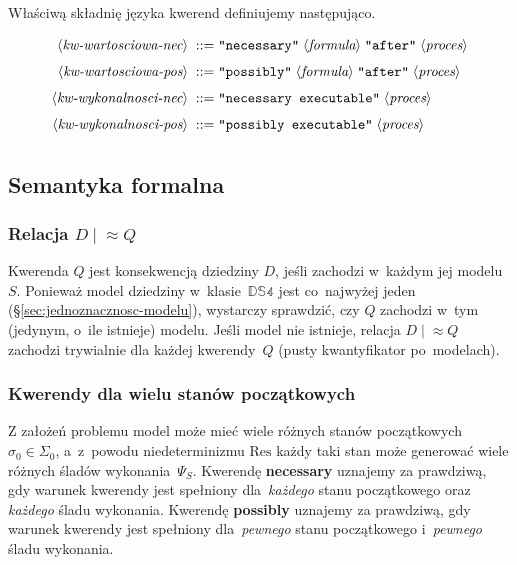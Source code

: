 \documentclass[11pt,a4paper]{article}
\newcommand{\bnfchar}[1]{\texttt{\textquotedbl#1\textquotedbl}}
\newcommand{\bnfsym}[1]{\langle \textit{#1} \rangle}
\theoremstyle{definition}
\begin{document}
Właściwą składnię języka kwerend definiujemy następująco.

\begin{align*}
    \bnfsym{kw-wartosciowa-nec} \;::=\;& \bnfchar{necessary} \; \bnfsym{formula} \; \bnfchar{after} \; \bnfsym{proces} \\[4pt]
    \bnfsym{kw-wartosciowa-pos} \;::=\;& \bnfchar{possibly} \; \bnfsym{formula} \; \bnfchar{after} \; \bnfsym{proces} \\[4pt]    
    \bnfsym{kw-wykonalnosci-nec} \;::=\;& \bnfchar{necessary executable} \; \bnfsym{proces} \\[4pt]
    \bnfsym{kw-wykonalnosci-pos} \;::=\;& \bnfchar{possibly executable} \; \bnfsym{proces} \\[4pt]    
\end{align*}

\subsection{Semantyka formalna}
\label{sec:sem-kwerend}

\subsubsection*{Relacja \texorpdfstring{$D \mid \! \approx Q$}{D |≈ Q}}

Kwerenda $Q$ jest konsekwencją dziedziny $D$, jeśli zachodzi w~każdym jej modelu $S$. Ponieważ model dziedziny w~klasie~$\mathbb{DS4}$ jest co~najwyżej jeden (§\ref{sec:jednoznacznosc-modelu}), wystarczy sprawdzić, czy $Q$ zachodzi w~tym (jedynym, o~ile istnieje) modelu. Jeśli model nie istnieje, relacja $D \mid\!\approx Q$ zachodzi trywialnie dla każdej kwerendy~$Q$ (pusty kwantyfikator po~modelach).

\subsubsection*{Kwerendy dla wielu stanów początkowych}

Z założeń problemu model może mieć wiele różnych stanów początkowych $\sigma_0 \in \Sigma_0$, a~z~powodu niedeterminizmu $\mathrm{Res}$ każdy taki stan może generować wiele różnych śladów wykonania~$\Psi_S$. Kwerendę \textbf{necessary} uznajemy za prawdziwą, gdy warunek kwerendy jest spełniony dla~\emph{każdego} stanu początkowego oraz \emph{każdego} śladu wykonania. Kwerendę \textbf{possibly} uznajemy za prawdziwą, gdy warunek kwerendy jest spełniony dla~\emph{pewnego} stanu początkowego i~\emph{pewnego} śladu wykonania.
\end{document}
